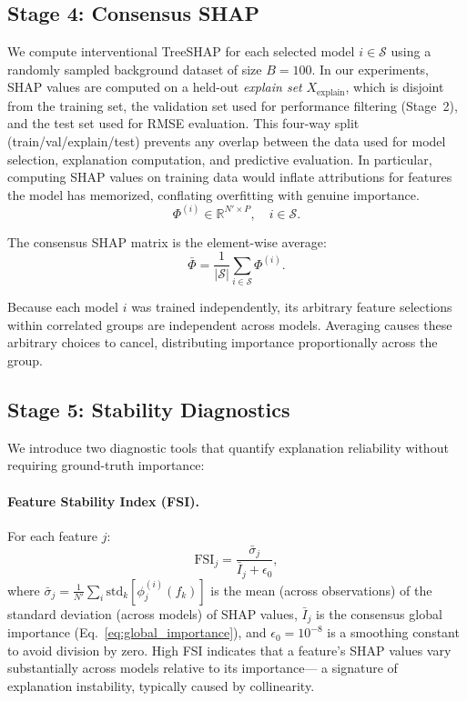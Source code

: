 \documentclass[11pt]{article}
\begin{document}
\subsection{Stage 4: Consensus SHAP}

We compute interventional TreeSHAP \citep{lundberg2020local} for each
selected model $i \in \mathcal{S}$ using a randomly sampled background
dataset of size $B = 100$. In our experiments, SHAP values are computed
on a held-out \emph{explain set} $X_{\text{explain}}$, which is disjoint
from the training set, the validation set used for performance filtering
(Stage~2), and the test set used for RMSE evaluation. This four-way split
(train/val/explain/test) prevents any overlap between the data used for
model selection, explanation computation, and predictive evaluation.
In particular, computing SHAP values on training data would inflate
attributions for features the model has memorized, conflating
overfitting with genuine importance.
\begin{equation}
  \Phi^{(i)} \in \mathbb{R}^{N' \times P}, \quad i \in \mathcal{S}.
\end{equation}

The consensus SHAP matrix is the element-wise average:
\begin{equation}
  \bar{\Phi} = \frac{1}{|\mathcal{S}|} \sum_{i \in \mathcal{S}} \Phi^{(i)}.
  \label{eq:consensus}
\end{equation}

Because each model $i$ was trained independently, its arbitrary feature
selections within correlated groups are independent across models.
Averaging causes these arbitrary choices to cancel, distributing
importance proportionally across the group.

\subsection{Stage 5: Stability Diagnostics}

We introduce two diagnostic tools that quantify explanation reliability
without requiring ground-truth importance:

\paragraph{Feature Stability Index (FSI).}
For each feature $j$:
\begin{equation}
  \text{FSI}_j = \frac{\bar{\sigma}_j}{\bar{I}_j + \epsilon_0},
  \label{eq:fsi}
\end{equation}
where $\bar{\sigma}_j = \frac{1}{N'}\sum_i \text{std}_k[\phi_j^{(i)}(f_k)]$
is the mean (across observations) of the standard deviation (across models)
of SHAP values, $\bar{I}_j$ is the consensus global importance
(Eq.~\ref{eq:global_importance}), and $\epsilon_0 = 10^{-8}$ is a smoothing
constant to avoid division by zero. High FSI indicates that a feature's
SHAP values vary substantially across models relative to its importance---
a signature of explanation instability, typically caused by collinearity.
\end{document}
